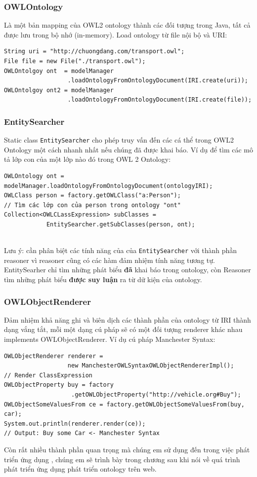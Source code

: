 \subsubsection{OWLOntology}
Là một bản mapping của OWL2 ontology thành các đối tượng trong Java, tất cả được lưu trong bộ nhớ (in-memory). Load ontology từ file nội bộ và URI:
\begin{verbatim}
String uri = "http://chuongdang.com/transport.owl";
File file = new File("./transport.owl");
OWLOntolgoy ont  = modelManager
                  .loadOntologyFromOntologyDocument(IRI.create(uri));
OWLOntolgoy ont2 = modelManager
                  .loadOntologyFromOntologyDocument(IRI.create(file));
\end{verbatim}
\subsubsection{EntitySearcher}
Static class \verb|EntitySearcher| cho phép truy vấn đến các cá thể trong OWL2 Ontology một cách nhanh nhất nếu chúng đã được khai báo. Ví dụ để tìm các mô tả lớp con của một lớp nào đó trong OWL 2 Ontology:
\begin{verbatim}
OWLOntology ont = modelManager.loadOntologyFromOntologyDocument(ontologyIRI);
OWLClass person = factory.getOWLClass("a:Person");
// Tìm các lớp con của person trong ontology "ont"
Collection<OWLCLassExpression> subClasses = 
			EntitySearcher.getSubClasses(person, ont);
			
\end{verbatim}
Lưu ý: cần phân biệt các tính năng của của \verb|EntitySearcher| với thành phần reasoner vì reasoner cũng có các hàm đảm nhiệm tính năng tương tự. EntitySearher chỉ tìm những phát biểu \textbf{đã} khai báo trong ontology, còn Reasoner tìm những phát biểu \textbf{được suy luận} ra từ dữ kiện của ontology.

\subsubsection{OWLObjectRenderer}
Đảm nhiệm khả năng ghi và biên dịch các thành phần của ontology từ IRI thành dạng vắng tắt, mỗi một dạng cú pháp sẽ có một đối tượng renderer khác nhau implements OWLObjectRenderer. Ví dụ cú pháp Manchester Syntax:
\begin{verbatim}
OWLObjectRenderer renderer = 
                  new ManchesterOWLSyntaxOWLObjectRendererImpl();
// Render ClassExpression
OWLObjectProperty buy = factory
                   .getOWLObjectProperty("http://vehicle.org#Buy");
OWLObjectSomeValuesFrom ce = factory.getOWLObjectSomeValuesFrom(buy, car);
System.out.println(renderer.render(ce));
// Output: Buy some Car <- Manchester Syntax
\end{verbatim}
Còn rất nhiều thành phần quan trọng mà chúng em sử dụng đến trong việc phát triển ứng dụng , chúng em sẽ trình bày trong chương sau khi nói về quá trình phát triển ứng dụng phát triển ontology trên web.
